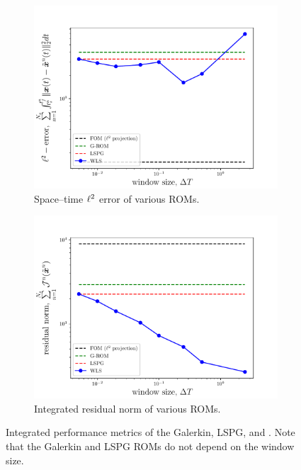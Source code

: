 \begin{figure}
\begin{center}
\begin{subfigure}[t]{0.45\textwidth}
\includegraphics[width=1.\linewidth]{figs/sod/error_vs_window_compare.pdf}
\caption{Space--time $\ell^2$ error of various ROMs.}
\label{fig:sod_error_a}
\end{subfigure}
\begin{subfigure}[t]{0.45\textwidth}
\includegraphics[width=1.\linewidth]{figs/sod/objective_vs_window_compare.pdf}
\caption{Integrated residual norm of various ROMs.} 
\label{fig:sod_error_b}
\end{subfigure}
\caption{Integrated performance metrics of the Galerkin, LSPG, and \methodAcronymROMs.  Note that the Galerkin and LSPG ROMs do not depend on the window size.} 
\label{fig:sod_error}
\end{center}
\end{figure}

